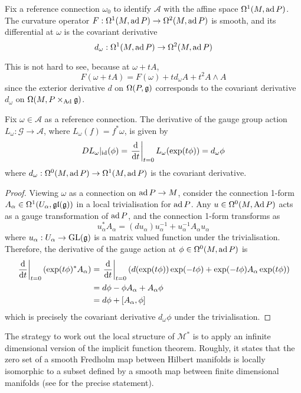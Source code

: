 \begin{prop} \label{prop:curvature_derivative}
Fix a reference connection $\omega_0$ to identify
$\mathcal{A}$ with the affine space $\Omega^1(M,\operatorname{ad} P)$. 
The curvature operator $F:\Omega^1(M,\operatorname{ad} P) \to \Omega^2(M,\operatorname{ad} P)$ is smooth, and
its differential at $\omega$ is the covariant derivative
\[
d_{\omega} : \Omega^1(M,\operatorname{ad} P) \to \Omega^2(M,\operatorname{ad} P)
\]
\end{prop}
\noindent
This is not hard to see, because at $\omega + tA$,
\[
F(\omega + tA) = F(\omega) + t d_{\omega}A + t^2 A\wedge A 
\] %
since the exterior derivative $d$ on $\Omega(P,\operatorname{\mathfrak{g}})$ corresponds to the covariant
derivative $d_{\omega}$ on $\Omega(M,P\times_{\operatorname{Ad}}\operatorname{\mathfrak{g}})$. 

\begin{prop} \label{prop:gauge_derivative} %
	Fix $\omega \in \mathcal{A}$ as a reference connection. 
	The derivative of the gauge group action 
	$L_\omega : \mathcal{G} \to \mathcal{A}$, where $L_\omega(f) = f^*\omega$, 
	is given by 
	\[
	DL_\omega|_{\id}(\phi) = \odv{}{t}_{t=0} L_\omega(\exp(t\phi)) = d_\omega \phi
	\] 
	where $d_\omega : \Omega^0(M,\operatorname{ad} P) \to \Omega^1(M,\operatorname{ad} P)$ is the covariant
	derivative.
\end{prop}
\begin{proof}
	Viewing $\omega$ as a connection on  $\operatorname{ad} P \to M$, 
	consider the connection 1-form $A_\alpha \in \Omega^1(U_\alpha,\operatorname{\mathfrak{gl}}(\operatorname{\mathfrak{g}}))$ in a 
	local trivialisation for $\operatorname{ad} P$. Any $u \in \Omega^0(M,\operatorname{Ad} P)$ acts as a 
	gauge transformation of $\operatorname{ad} P$, and the connection 1-form transforms as 
	\[
	u_\alpha^*A_\alpha = (du_\alpha) u_\alpha^{-1} + u_\alpha^{-1}A_\alpha u_\alpha
	\] 
	where $u_\alpha : U_\alpha \to\operatorname{GL}(\operatorname{\mathfrak{g}})$ is a matrix valued function 
	under the trivialisation.  
	Therefore, the derivative of the gauge action at $\phi\in \Omega^0(M,\operatorname{ad} P)$ is 
	\begin{align*}
		\odv{}{t}_{t=0} (\exp(t\phi)^* A_\alpha)
		&= \odv{}{t}_{t=0} (d(\exp(t\phi))\exp(-t\phi)
		+ \exp(-t\phi)A_\alpha\exp(t\phi)) \\
		&= d\phi -\phi A_\alpha + A_\alpha\phi \\
		&= d\phi + [A_\alpha, \phi] 
	\end{align*}
	which is precisely the covariant derivative $d_\omega \phi$ under the trivialisation.
\end{proof}

The strategy to work out the local structure of $\mathcal{M}^*$ is to apply 
an infinite dimensional version of the implicit function theorem. 
Roughly, it states that the
zero set of a smooth Fredholm map between Hilbert manifolds is locally 
isomorphic to a subset defined
by a smooth map between finite dimensional manifolds (see \cite[Lemma
5.2.1]{morgan} for the precise statement). 



